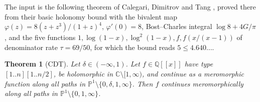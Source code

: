 \documentclass[11pt]{amsart}
\newtheorem{theorem}{Theorem}[section]
\theoremstyle{remark}
\newcommand{\Q}{\mathbb Q}\newcommand{\Z}{\mathbb Z}\newcommand{\R}{\mathbb R}\newcommand{\C}{\mathbb C}
\newcommand{\PP}{\mathbb P}\newcommand{\D}{\mathbb D}\newcommand{\T}{\mathbb T}\newcommand{\Cl}{\mathrm{Cl}_2}\newcommand{\Li}{\mathrm{Li}_2}
\newcommand{\lcm}[1]{[1..#1]}
\begin{document}
The input is the following theorem of Calegari, Dimitrov and Tang \cite[Theorem \texttt{noextrassmall}, part $(\ast)$]{CDT}, proved there from their basic holonomy bound with the bivalent map $\varphi(z)=8(z+z^3)/(1+z)^4$, $\varphi'(0)=8$, Bost--Charles integral $\log8+4G/\pi$, and the five functions $1,\log(1-x),\log^2(1-x),f,f(x/(x-1))$ of denominator rate $\tau=69/50$, for which the bound reads $5\le4.640\ldots$.

\begin{theorem}[CDT]\label{cdt}
Let $\delta\in(-\infty,1)$. Let $f\in\Q[[x]]$ have type $\lcm n\lcm{n/2}$, be holomorphic in $\C\setminus[1,\infty)$, and continue as a meromorphic function along all paths in $\PP^1\setminus\{0,\delta,1,\infty\}$. Then $f$ continues meromorphically along all paths in $\PP^1\setminus\{0,1,\infty\}$.
\end{theorem}
\end{document}
